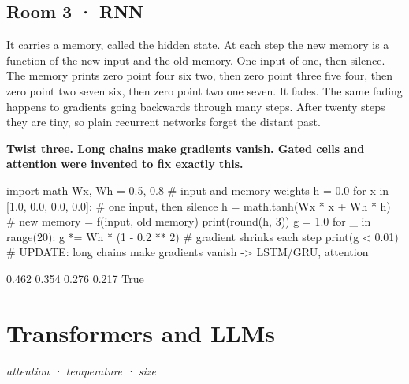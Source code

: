 \documentclass[11pt,a4paper]{report}
\begin{document}
\section*{Room 3 · RNN}
It carries a memory, called the hidden state. At each step the new memory is a function of the new input and the old memory. One input of one, then silence. The memory prints zero point four six two, then zero point three five four, then zero point two seven six, then zero point two one seven. It fades. The same fading happens to gradients going backwards through many steps. After twenty steps they are tiny, so plain recurrent networks forget the distant past.
\begin{tcolorbox}[colback=yellow!12,colframe=orange!70!black,boxrule=0.4pt,left=4pt,right=4pt,top=2pt,bottom=2pt]\textbf{Twist three. Long chains make gradients vanish. Gated cells and attention were invented to fix exactly this.}\end{tcolorbox}
\begin{Code}
import math
Wx, Wh = 0.5, 0.8                           # input and memory weights
h = 0.0
for x in [1.0, 0.0, 0.0, 0.0]:              # one input, then silence
    h = math.tanh(Wx * x + Wh * h)          # new memory = f(input, old memory)
    print(round(h, 3))
g = 1.0
for _ in range(20): g *= Wh * (1 - 0.2 ** 2)   # gradient shrinks each step
print(g < 0.01)
# UPDATE: long chains make gradients vanish -> LSTM/GRU, attention
\end{Code}
\begin{Out}
0.462
0.354
0.276
0.217
True
\end{Out}
\chapter{Transformers and LLMs}
\textit{attention · temperature · size}
\end{document}
